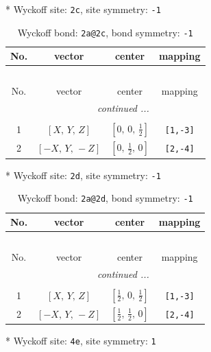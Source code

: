 \documentclass[fleqn,8pt]{jsarticle}
\begin{document}
* Wyckoff site: {\tt 2c}, site symmetry: {\tt -1}
\renewcommand{\arraystretch}{1.2}
\begin{longtable}{cccc}
\caption{Wyckoff bond: {\tt 2a@2c}, bond symmetry: {\tt -1}}
 \\
 \hline \hline
No. & vector & center & mapping \\ \hline \endfirsthead

\multicolumn{3}{l}{\tablename\ \thetable{}} \\
 \hline \hline
No. & vector & center & mapping \\ \hline \endhead

 \hline \hline
\multicolumn{3}{r}{\footnotesize\it continued ...} \\ \endfoot

 \hline \hline
\multicolumn{3}{r}{} \\ \endlastfoot

1 & $\left[ X,\, Y,\, Z \right]$ & $\left[ 0,\, 0,\, \frac{1}{2} \right]$ & {\tt [1,-3]} \\ \hline
2 & $\left[ - X,\, Y,\, - Z \right]$ & $\left[ 0,\, \frac{1}{2},\, 0 \right]$ & {\tt [2,-4]} \\
\end{longtable}
* Wyckoff site: {\tt 2d}, site symmetry: {\tt -1}
\renewcommand{\arraystretch}{1.2}
\begin{longtable}{cccc}
\caption{Wyckoff bond: {\tt 2a@2d}, bond symmetry: {\tt -1}}
 \\
 \hline \hline
No. & vector & center & mapping \\ \hline \endfirsthead

\multicolumn{3}{l}{\tablename\ \thetable{}} \\
 \hline \hline
No. & vector & center & mapping \\ \hline \endhead

 \hline \hline
\multicolumn{3}{r}{\footnotesize\it continued ...} \\ \endfoot

 \hline \hline
\multicolumn{3}{r}{} \\ \endlastfoot

1 & $\left[ X,\, Y,\, Z \right]$ & $\left[ \frac{1}{2},\, 0,\, \frac{1}{2} \right]$ & {\tt [1,-3]} \\ \hline
2 & $\left[ - X,\, Y,\, - Z \right]$ & $\left[ \frac{1}{2},\, \frac{1}{2},\, 0 \right]$ & {\tt [2,-4]} \\
\end{longtable}
* Wyckoff site: {\tt 4e}, site symmetry: {\tt 1}
\renewcommand{\arraystretch}{1.2}
\end{document}
